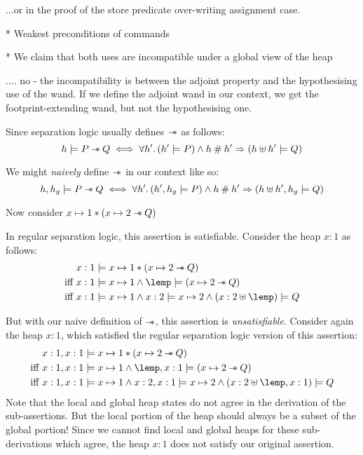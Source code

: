 \documentclass[a4paper,notitlepage]{report}
\begin{document}
    ...or in the proof of the store predicate over-writing assignment case.

* Weakest preconditions of commands

* We claim that both uses are incompatible under a global view of the heap

    .... no - the incompatibility is between the adjoint property and the
    hypothesising use of the wand. If we define the adjoint wand in our context,
    we get the footprint-extending wand, but not the hypothesising one.

Since separation logic usually defines  $\mathbin{-\mkern-6mu *}$
as follows:
\[
  h \models P \mathbin{-\mkern-6mu *} Q \iff \forall h' \mathpunct{.} (h' \models P) \land h \mathbin{\#}
    h' \Rightarrow (h \uplus h' \models Q)
\]

We might \emph{naively} define $\mathbin{-\mkern-6mu *}$ in our context like so:
\[
  h,h_g \models P \mathbin{-\mkern-6mu *} Q \iff \forall h' \mathpunct{.} (h',h_g \models P) \land h \mathbin{\#}
    h' \Rightarrow (h \uplus h',h_g \models Q)
\]

Now consider $x \mapsto 1 \mathbin{*} (x \mapsto 2 \mathbin{-\mkern-6mu *} Q)$

 In regular separation logic, this assertion is satisfiable. Consider the heap
 $x:1$ as follows:
\begin{align*}
           & x:1 \satisfies x \pointsto 1 \sep (x \pointsto 2 \wand Q) \\
\text{iff } & x:1 \satisfies x \pointsto 1 \land \lemp \satisfies (x \pointsto 2 \wand Q) \\
\text{iff } & x:1 \satisfies x \pointsto 1 \land x:2 \satisfies x \pointsto 2 \land (x:2 \disju \lemp) \satisfies Q
\end{align*}

But with our naive definition of $\mathbin{-\mkern-6mu *}$, this assertion is
\emph{unsatisfiable}. Consider again the heap $x:1$, which satisfied the regular
separation logic version of this assertion:
\begin{align*}
           & x:1,x:1 \satisfies x \pointsto 1 \sep (x \pointsto 2 \wand Q) \\
\text{iff } & x:1,x:1 \satisfies x \pointsto 1 \land \lemp,x:1 \satisfies (x \pointsto 2 \wand Q) \\
\text{iff } & x:1,x:1 \satisfies x \pointsto 1 \land x:2,x:1 \satisfies x \pointsto 2 \land (x:2 \disju \lemp,x:1) \satisfies Q
\end{align*}
Note that the local and global heap states do not agree in the derivation of the
sub-assertions. But the local portion of the heap should always be a subset of the
global portion! Since we cannot find local and global heaps for these
sub-derivations which agree, the heap $x:1$ does not satisfy our original assertion.
\end{document}
